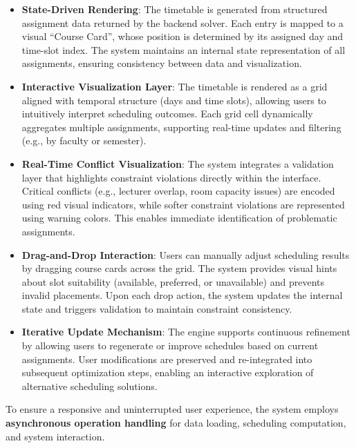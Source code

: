 \documentclass[11pt,a4paper]{article}
\begin{document}
\begin{itemize}
    \item \textbf{State-Driven Rendering}: The timetable is generated from structured assignment data returned by the backend solver. Each entry is mapped to a visual ``Course Card'', whose position is determined by its assigned day and time-slot index. The system maintains an internal state representation of all assignments, ensuring consistency between data and visualization.
    
    \item \textbf{Interactive Visualization Layer}: The timetable is rendered as a grid aligned with temporal structure (days and time slots), allowing users to intuitively interpret scheduling outcomes. Each grid cell dynamically aggregates multiple assignments, supporting real-time updates and filtering (e.g., by faculty or semester).
    
    \item \textbf{Real-Time Conflict Visualization}: The system integrates a validation layer that highlights constraint violations directly within the interface. Critical conflicts (e.g., lecturer overlap, room capacity issues) are encoded using red visual indicators, while softer constraint violations are represented using warning colors. This enables immediate identification of problematic assignments.
    
    \item \textbf{Drag-and-Drop Interaction}: Users can manually adjust scheduling results by dragging course cards across the grid. The system provides visual hints about slot suitability (available, preferred, or unavailable) and prevents invalid placements. Upon each drop action, the system updates the internal state and triggers validation to maintain constraint consistency.
    
    \item \textbf{Iterative Update Mechanism}: The engine supports continuous refinement by allowing users to regenerate or improve schedules based on current assignments. User modifications are preserved and re-integrated into subsequent optimization steps, enabling an interactive exploration of alternative scheduling solutions.
\end{itemize}

To ensure a responsive and uninterrupted user experience, the system employs \textbf{asynchronous operation handling} for data loading, scheduling computation, and system interaction.
\end{document}
